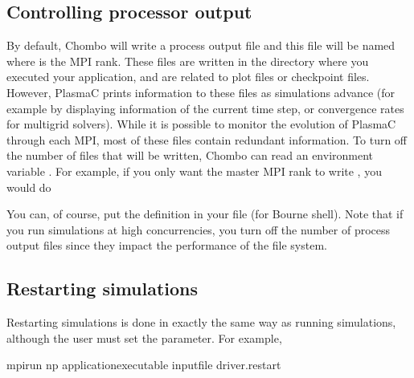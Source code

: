 \documentclass[letterpaper,10pt,english]{sphinxmanual}
\begin{document}
\subsection{Controlling processor output}
\label{\detokenize{Control:controlling-processor-output}}
By default, Chombo will write a process output file  and this file will be named  where  is the MPI rank. These files are written in the directory where you executed your application, and are  related to plot files or checkpoint files. However, PlasmaC prints information to these files as simulations advance (for example by displaying information of the current time step, or convergence rates for multigrid solvers). While it is possible to monitor the evolution of PlasmaC through each MPI, most of these files contain redundant information. To turn off the number of files that will be written, Chombo can read an environment variable . For example, if you only want the master MPI rank to write , you would do

\begin{sphinxVerbatim}[commandchars=\\\{\},formatcom=\scriptsize]
 
\end{sphinxVerbatim}

You can, of course, put the definition in your  file (for Bourne shell). Note that if you run simulations at high concurrencies, you  turn off the number of process output files since they impact the performance of the file system.


\subsection{Restarting simulations}
\label{\detokenize{Control:restarting-simulations}}\label{\detokenize{Control:chap-restartingsimulations}}
Restarting simulations is done in exactly the same way as running simulations, although the user must set the  parameter. For example,

\begin{sphinxVerbatim}[commandchars=\\\{\},formatcom=\scriptsize]
mpirun \PYGZhy{}np  \PYGZlt{}application\PYGZus{}executable\PYGZgt{} \PYGZlt{}input\PYGZus{}file\PYGZgt{} driver.restart
\end{sphinxVerbatim}
\end{document}
